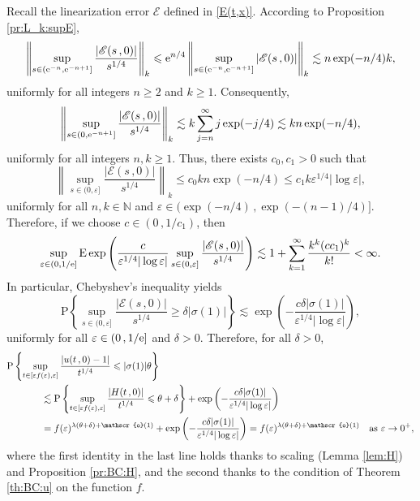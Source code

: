 \documentclass[reqno]{amsart}
\newcommand{\<}{\langle}
\renewcommand{\>}{\rangle}
\newcommand{\N}{\mathbb{N}}
\renewcommand{\P}{\mathrm{P}}
\newcommand{\E}{\mathrm{E}}
\newcommand{\1}{\mathbb{1}}
\newcommand{\e}{{\rm e}}
\renewcommand{\ge}{\geqslant}
\renewcommand{\le}{\leqslant}
\theoremstyle{definition}
\numberwithin{equation}{section}
\begin{document}
Recall the linearization error $\mathscr{E}$ defined in \eqref{E(t,x)}.
According to Proposition \ref{pr:L_k:supE},
\[
	\left\| \sup_{s\in(\e^{-n},\e^{-n+1}]}
	\frac{|\mathscr{E}(s\,,0)|}{s^{1/4}}\right\|_k
	\le \e^{n/4} \left\| \sup_{s\in(\e^{-n},\e^{-n+1}]}
	|\mathscr{E}(s\,,0)|\right\|_k
	\lesssim n\exp(-n/4) k,
\]
uniformly for all integers $n\ge2$ and $k\ge1$. Consequently,
\[
	\left\| \sup_{s\in(0,\e^{-n+1}]}
	\frac{|\mathscr{E}(s\,,0)|}{s^{1/4}}\right\|_k
	\lesssim k\sum_{j=n}^\infty j \exp(-j/4)\lesssim kn \exp(-n/4),
\]
uniformly for all integers $n,k\ge1$. Thus, there exists $c_0,c_1>0$ such that
\[
	\left\| \sup_{s\in(0,\varepsilon]}
	\frac{|\mathscr{E}(s\,,0)|}{s^{1/4}}\right\|_k
	\le c_0 k n\exp(-n/4) \le c_1 k\varepsilon^{1/4}|\log\varepsilon|,
\]
uniformly for all  $n,k\in\N$ and $\varepsilon\in(\exp(-n/4)\,, \exp(-(n-1)/4)]$.
Therefore, if we choose $c\in(0\,,1/c_1)$, then
\begin{align*}
	\sup_{\varepsilon\in(0,1/\e]}
	\E\exp\left( \frac{c}{\varepsilon^{1/4}|\log\varepsilon|}\sup_{s\in(0,\varepsilon]}
	\frac{|\mathscr{E}(s\,,0)|}{s^{1/4}}\right)
	\lesssim 1 + \sum_{k=1}^\infty \frac{k^k(cc_1)^k}{k!}<\infty.
\end{align*}
In particular, Chebyshev's inequality yields
\[
	\P\left\{ \sup_{s\in(0,\varepsilon]}
	\frac{|\mathscr{E}(s\,,0)|}{s^{1/4}} \ge \delta |\sigma(1)|\right\}
	\lesssim \exp\left( - \frac{c\delta|\sigma(1)|}{\varepsilon^{1/4}|\log\varepsilon|}\right),
\]
uniformly for all $\varepsilon\in(0\,,1/\e]$ and $\delta>0$.
Therefore, for all $\delta>0$,
\begin{align*}
	&\P\left\{ \sup_{t \in [\varepsilon f(\varepsilon),\varepsilon]} 
		\frac{|u(t\,,0)-1|}{t^{1/4}} \le |\sigma(1)|\theta \right\}\\
	&\hskip.5in\lesssim \P\left\{ \sup_{t \in [\varepsilon f(\varepsilon),\varepsilon]}
		\frac{|H(t\,,0)|}{t^{1/4}} \le \theta + \delta \right\}
		+ \exp\left( - \frac{c\delta|\sigma(1)|}{\varepsilon^{1/4}|\log\varepsilon|}\right)\\
	&\hskip.5in= f(\varepsilon)^{\lambda(\theta+\delta)+\mathscr{o}(1)}
		+ \exp\left( - \frac{c\delta|\sigma(1)|}{\varepsilon^{1/4}|\log\varepsilon|}\right)
		= f(\varepsilon)^{\lambda(\theta+\delta)+\mathscr{o}(1)}
		\quad\text{as $\varepsilon\to0^+$},
\end{align*}
where the first identity in the last line holds thanks to scaling (Lemma \ref{lem:H})
and Proposition \ref{pr:BC:H}, and the second thanks to the condition 
of Theorem \ref{th:BC:u} on the function $f$.
\end{document}
